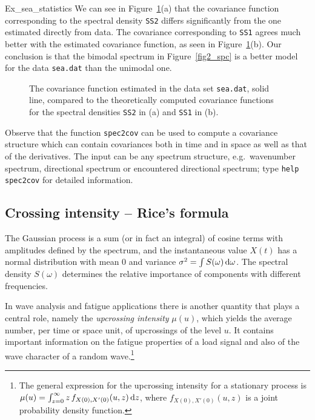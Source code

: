 \begin{cex}{Ex_sea_statistics}
We can see in Figure~\ref{fig4_s2c}(a)
that the covariance function corresponding to the spectral density {\tt SS2}
differs significantly from the one estimated directly from data.
The covariance corresponding to {\tt SS1} agrees much
better with the estimated covariance function, as seen in Figure~\ref{fig4_s2c}(b). 
Our conclusion is that the bimodal spectrum in Figure~\ref{fig2_spc} is a better 
model for the data {\tt sea.dat} than the unimodal one. 
~ \end{cex}

\begin{figure}
%
\hfill
{}
\vspace{-3mm}
\caption[ACF computed from spectra of
{\tt sea.dat} with smoothing]{
The covariance function estimated in the data set {\tt sea.dat}, solid line,
compared to the theoretically computed covariance functions for the spectral
densities {\tt SS2} in (a) and {\tt SS1} in (b).
}
  \label{fig4_s2c}
\end{figure}

Observe that the \progname{} function {\tt spec2cov} can be used to compute
a covariance structure which can contain covariances both in time and in
space as well as that of the derivatives.
The input can be any spectrum structure, e.g.\ wavenumber spectrum,
directional spectrum or encountered directional spectrum;
type {\tt help spec2cov} for detailed information.

\subsection{Crossing intensity -- Rice's formula}
\label{subsec:crossing_intensity}
The Gaussian process is a sum (or in fact an integral) of cosine terms with amplitudes defined
by the spectrum, and the instantaneous value $X(t)$ has a normal distribution
with mean $0$ and variance $\sigma^2 = \int S(\omega)\, \mathrm{d} \omega$. 
The spectral density $S(\omega)$ determines the relative importance of 
components with different frequencies. 

In wave analysis and fatigue applications there is another quantity that
plays a central role, namely the {\em upcrossing intensity} $\mu(u)$,
which yields the average number, per time or space unit,
of upcrossings of the level $u$. It
contains important information on the fatigue properties of a
load signal and also of the wave character of a random wave.\footnote{%
The general expression for the upcrossing intensity for a stationary process
 is
$\mu(u)=\int_{z=0}^\infty z\, f_{X(0),X'(0)}(u,z)\, \mathrm{d} z$, where
$f_{X(0),X'(0)}(u,z)$ is a joint probability density function.}

